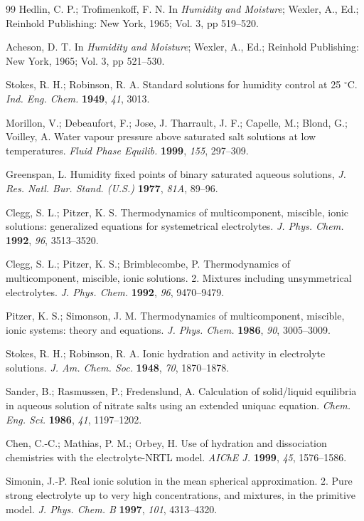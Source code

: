 \documentclass[11pt]{article}
\begin{document}
\begin{thebibliography}{99}
 Hedlin, C. P.; Trofimenkoff, F. N. In \textit{Humidity and
Moisture}; Wexler, A., Ed.; Reinhold Publishing: New York, 1965; Vol. 3,
pp 519--520.

 Acheson, D. T. In \textit{Humidity and Moisture}; Wexler, A.,
Ed.; Reinhold Publishing: New York, 1965; Vol. 3, pp 521--530.

 Stokes, R. H.; Robinson, R. A. Standard solutions for humidity
control at 25 $^{\circ}$C. \textit{Ind. Eng. Chem.} \textbf{1949},
\textit{41}, 3013.

 Morillon, V.; Debeaufort, F.; Jose, J. Tharrault, J. F.;
Capelle, M.; Blond, G.; Voilley, A. Water vapour pressure above saturated salt
solutions at low temperatures. \textit{Fluid Phase Equilib.} \textbf{1999},
\textit{155}, 297--309.

 Greenspan, L. Humidity fixed points of binary saturated
aqueous solutions, \textit{J. Res. Natl. Bur. Stand. (U.S.)} \textbf{1977},
\textit{81A}, 89--96.

 Clegg, S. L.; Pitzer, K. S. Thermodynamics of multicomponent,
miscible, ionic solutions: generalized equations for systemetrical
electrolytes. \textit{J. Phys. Chem.} \textbf{1992}, \textit{96}, 3513--3520.

 Clegg, S. L.; Pitzer, K. S.; Brimblecombe, P. Thermodynamics
of multicomponent, miscible, ionic solutions. 2. Mixtures including
unsymmetrical electrolytes. \textit{J. Phys. Chem.} \textbf{1992}, \textit{96},
9470--9479.

 Pitzer, K. S.; Simonson, J. M. Thermodynamics of
multicomponent, miscible, ionic systems: theory and equations. \textit{J. Phys.
Chem.} \textbf{1986}, \textit{90}, 3005--3009.

 Stokes, R. H.; Robinson, R. A. Ionic hydration and activity in
electrolyte solutions. \textit{J. Am. Chem. Soc.} \textbf{1948}, \textit{70},
1870--1878.

 Sander, B.; Rasmussen, P.; Fredenslund, A. Calculation of
solid/liquid equilibria in aqueous solution of nitrate salts using an extended
uniquac equation. \textit{Chem. Eng. Sci.} \textbf{1986}, \textit{41},
1197--1202.

 Chen, C.-C.; Mathias, P. M.; Orbey, H. Use of hydration and
dissociation chemistries with the electrolyte-NRTL model. \textit{AIChE J.}
\textbf{1999}, \textit{45}, 1576--1586.

 Simonin, J.-P. Real ionic solution in the mean spherical
approximation. 2. Pure strong electrolyte up to very high concentrations, and
mixtures, in the primitive model. \textit{J. Phys. Chem. B} \textbf{1997},
\textit{101}, 4313--4320.


\end{thebibliography}
\end{document}
